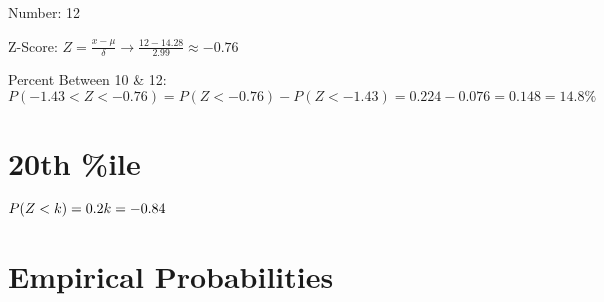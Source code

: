 \documentclass[a4paper]{article}
\begin{document}

Number: 12

Z-Score: $Z = \frac{x-\mu}{\delta}\rightarrow\frac{12-14.28}{2.99}\approx-0.76$

Percent Between 10 \& 12: \\
$P(-1.43 < Z < -0.76) = P(Z < -0.76) - P(Z < -1.43) =  0.224 - 0.076 = 0.148 = 14.8\%$

\section{20th \%ile}

$P(Z < k) = 0.2 \\
k = -0.84$

\section{Empirical Probabilities}





\end{document}
